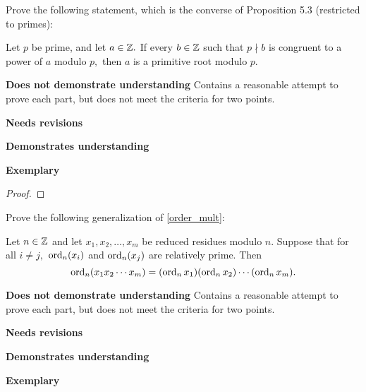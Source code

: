 \documentclass[letterpaper, 11pt]{../ximera}
\begin{document}
	
\begin{solution}
 
\end{solution}

\begin{ex}
    Prove the following statement, which is the converse of Proposition 5.3 (restricted to primes): 
	\begin{proposition}
 	    Let $p$ be prime, and let $a\in\mathbb Z.$ If every $b\in\mathbb Z$ such that $p\nmid b$ is congruent to a power of $a$ modulo $p,$ then ${a}$ is a primitive root modulo $p$.

	\end{proposition}
\end{ex}

\begin{writeRubric}
    \item \textbf{Does not demonstrate understanding}
     Contains a reasonable attempt to prove each part, but does not meet the criteria for two points.
    \item \textbf{Needs revisions}
     
    \item \textbf{Demonstrates understanding}
    
    \item \textbf{Exemplary}
        
\end{writeRubric}
                                       
\begin{proof}
 
\end{proof}

\begin{ex}
    Prove the following generalization of \ref{order_mult}:
    
    
    \begin{lemma}
        Let $n\in\mathbb Z$ and let $x_1,x_2,\dots,x_m$ be reduced residues modulo $n$.  Suppose that for all $i\neq j,$ $\operatorname{ord}_n(x_i)$ and $\operatorname{ord}_n(x_j)$ are relatively prime. Then \[\operatorname{ord}_n(x_1 x_2\cdots x_m)=(\operatorname{ord}_n x_1)(\operatorname{ord}_n x_2)\cdots (\operatorname{ord}_n x_m).\]
    \end{lemma}
\end{ex}

\begin{writeRubric}
    \item \textbf{Does not demonstrate understanding}
     Contains a reasonable attempt to prove each part, but does not meet the criteria for two points.
    \item \textbf{Needs revisions}
     
    \item \textbf{Demonstrates understanding}
    
    \item \textbf{Exemplary}
        
\end{writeRubric}
                                       
\end{document}
